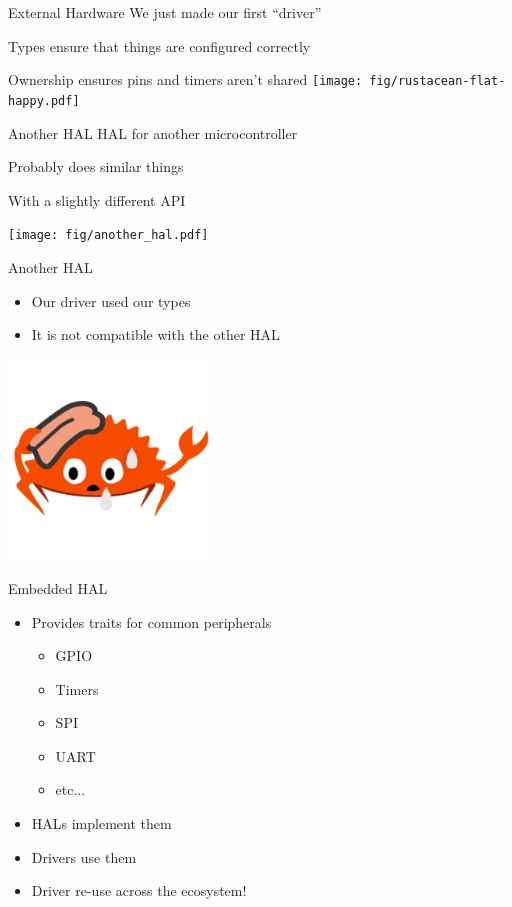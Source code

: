 \documentclass[aspectratio=169]{beamer}
\begin{document}
\begin{frame}{External Hardware}
    We just made our first ``driver''

    Types ensure that things are configured correctly

    Ownership ensures pins and timers aren't shared
    \hspace*{5cm}\texttt{[image: fig/rustacean-flat-happy.pdf]}
\end{frame}


\begin{frame}{Another HAL}
    HAL for another microcontroller

    Probably does similar things

    With a slightly different API

    \vspace*{1cm}\hspace*{2cm}\texttt{[image: fig/another\_hal.pdf]}
\end{frame}

\begin{frame}{Another HAL}
    \begin{itemize}
        \item Our driver used our types
        \item It is not compatible with the other HAL
    \end{itemize}
    \includegraphics[width=0.4\textwidth]{fig/static_sweat.png}
\end{frame}


\begin{frame}{Embedded HAL}
    \begin{itemize}
        \item Provides traits for common peripherals
        \begin{itemize}
            \item GPIO
            \item Timers
            \item SPI
            \item UART
            \item etc...
        \end{itemize}
        \item HALs implement them
        \item Drivers use them
        \item Driver re-use across the ecosystem!
    \end{itemize}
\end{frame}
\end{document}
